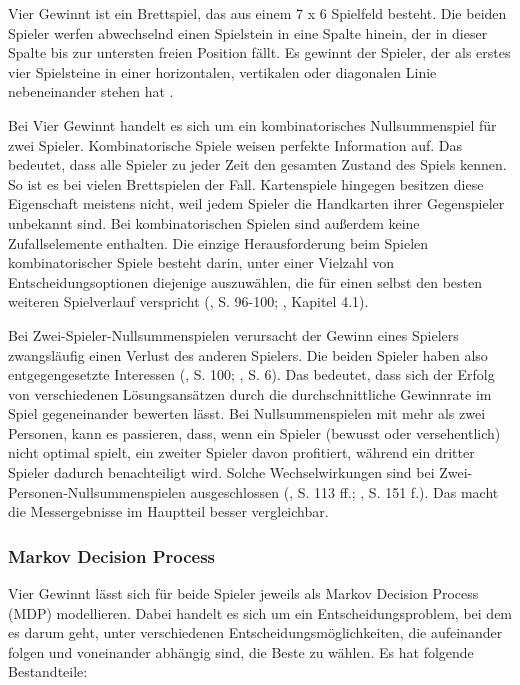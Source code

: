 \label{vier-gewinnt}

Vier Gewinnt ist ein Brettspiel, das aus einem 7 x 6 Spielfeld besteht. Die beiden Spieler werfen abwechselnd einen Spielstein in eine Spalte hinein, der in dieser Spalte bis zur untersten freien Position fällt. Es gewinnt der Spieler, der als erstes vier Spielsteine in einer horizontalen, vertikalen oder diagonalen Linie nebeneinander stehen hat \cite{MiltonBradleyCompany.1990}.

Bei Vier Gewinnt handelt es sich um ein kombinatorisches Nullsummenspiel für zwei Spieler. Kombinatorische Spiele weisen \glqq perfekte Information\grqq{} auf. Das bedeutet, dass alle Spieler zu jeder Zeit den gesamten Zustand des Spiels kennen. So ist es bei vielen Brettspielen der Fall. Kartenspiele hingegen besitzen diese Eigenschaft meistens nicht, weil jedem Spieler die Handkarten ihrer Gegenspieler unbekannt sind. Bei kombinatorischen Spielen sind außerdem keine Zufallselemente enthalten. Die einzige Herausforderung beim Spielen kombinatorischer Spiele besteht darin, unter einer Vielzahl von Entscheidungsoptionen diejenige auszuwählen, die für einen selbst den besten weiteren Spielverlauf verspricht (\cite{Bewersdorff.2018}, S. 96-100; \cite{Ferguson.January2019}, Kapitel 4.1).

Bei Zwei-Spieler-Nullsummenspielen verursacht der Gewinn eines Spielers zwangsläufig einen Verlust des anderen Spielers. Die beiden Spieler haben also entgegengesetzte Interessen (\cite{Bewersdorff.2018}, S. 100; \cite{Allis.1994}, S. 6). Das bedeutet, dass sich der Erfolg von verschiedenen Lösungsansätzen durch die durchschnittliche Gewinnrate im Spiel gegeneinander bewerten lässt. Bei Nullsummenspielen mit mehr als zwei Personen, kann es passieren, dass, wenn ein Spieler (bewusst oder versehentlich) nicht optimal spielt, ein zweiter Spieler davon profitiert, während ein dritter Spieler dadurch benachteiligt wird. Solche Wechselwirkungen sind bei Zwei-Personen-Nullsummenspielen ausgeschlossen (\cite{Bewersdorff.2018}, S. 113 ff.; \cite{Russell.2020}, S. 151 f.). Das macht die Messergebnisse im Hauptteil besser vergleichbar.

\subsubsection{Markov Decision Process}

Vier Gewinnt lässt sich für beide Spieler jeweils als Markov Decision Process (MDP) modellieren. Dabei handelt es sich um ein Entscheidungsproblem, bei dem es darum geht, unter verschiedenen Entscheidungsmöglichkeiten, die aufeinander folgen und voneinander abhängig sind, die Beste zu wählen. Es hat folgende Bestandteile:

